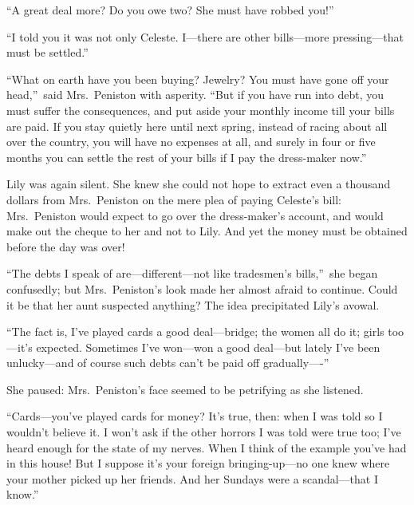 \documentclass[12pt,a4paper]{book}
\begin{document}
``A great deal more? Do you owe two? She must have robbed you!''





``I told you it was not only Celeste. I---there are other
bills---more pressing---that must be settled.''





``What on earth have you been buying? Jewelry? You must have gone
off your head,''\ said Mrs.\ Peniston with asperity. ``But if you
have run into debt, you must suffer the consequences, and put
aside your monthly income till your bills are paid. If you stay
quietly here until next spring, instead of racing about all over
the country, you will have no expenses at all, and surely in four
or five months you can settle the rest of your bills if I pay the
dress-maker now.''





Lily was again silent. She knew she could not hope to extract
even a thousand dollars from Mrs.\ Peniston on the mere plea of
paying Celeste's bill: Mrs.\ Peniston would expect to go over the
dress-maker's account, and would make out the cheque to her and
not to Lily. And yet the money must be obtained before the day
was over!





``The debts I speak of are---different---not like tradesmen's
bills,''\ she began confusedly; but Mrs.\ Peniston's look made her
almost afraid to continue. Could it be that her aunt suspected
anything? The idea precipitated Lily's avowal.





``The fact is, I've played cards a good deal---bridge; the women
all do it; girls too---it's expected. Sometimes I've won---won a
good deal---but lately I've been unlucky---and of course such debts
can't be paid off gradually----''





She paused: Mrs.\ Peniston's face seemed to be petrifying as she
listened.





``Cards---you've played cards for money? It's true, then: when I
was told so I wouldn't believe it. I won't ask if the other
horrors I was told were true too; I've heard enough for the state
of my nerves. When I think of the example you've had in this
house! But I suppose it's your foreign bringing-up---no one knew
where your mother picked up her friends. And her Sundays were a
scandal---that I know.''
\end{document}
